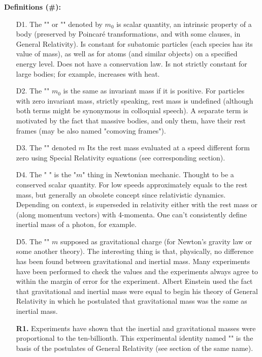 	\textbf{Definitions (\#\mydef):}
	\begin{enumerate}
		\item[D1.] The "" or "" denoted by $m_0$ is scalar quantity, an intrinsic property of a body (preserved by Poincaré transformations, and with some clauses, in General Relativity). Is constant for subatomic particles (each species has its value of mass), as well as for atoms (and similar objects) on a specified energy level. Does not have a conservation law. Is not strictly constant for large bodies; for example, increases with heat.

		\item[D2.] The "" $m_0$ is the same as invariant mass if it is positive. For particles with zero invariant mass, strictly speaking, rest mass is undefined (although both terms might be synonymous in colloquial speech). A separate term is motivated by the fact that massive bodies, and only them, have their rest frames (may be also named "comoving frames").
	
		\item[D3.] The "" denoted $m$ Its the rest mass evaluated at a speed different form zero using Special Relativity equations (see corresponding section).
		
		\item[D4.] The " " is the "$m$" thing in Newtonian mechanic. Thought to be a conserved scalar quantity. For low speeds approximately equals to the rest mass, but generally an obsolete concept since relativistic dynamics. Depending on context, is superseded in relativity either with the rest mass or (along momentum vectors) with 4-momenta. One can’t consistently define inertial mass of a photon, for example.

		\item[D5.] The "" $m$ supposed as gravitational charge (for Newton's gravity law or some another theory). The interesting thing is that, physically, no difference has been found between gravitational and inertial mass. Many experiments have been performed to check the values and the experiments always agree to within the margin of error for the experiment. Albert Einstein used the fact that gravitational and inertial mass were equal to begin his theory of General Relativity in which he postulated that gravitational mass was the same as inertial mass.
		\begin{tcolorbox}[title=Remarks,colframe=black,arc=10pt]
		\textbf{R1.} Experiments have shown that the inertial and gravitational masses were proportional to the ten-billionth. This experimental identity named "" is the basis of the postulates of General Relativity (see section of the same name).\\
		

\end{tcolorbox}
\end{enumerate}
